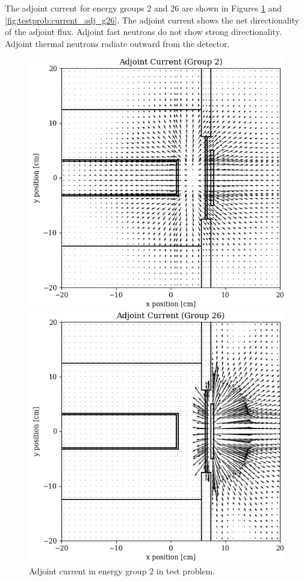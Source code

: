 The adjoint current for energy groups 2 and 26 are shown in Figures \ref{fig:testprob:current_adj_g02} and \ref{fig:testprob:current_adj_g26}.
The adjoint current shows the net directionality of the adjoint flux.
Adjoint fast neutrons do not show strong directionality.
Adjoint thermal neutrons radiate outward from the detector.

\begin{figure}
  \begin{minipage}{0.49\linewidth}
    \centering
    \includegraphics[width=\linewidth]{content/testprob/current_adj_g02.png}
    \caption{Adjoint current in energy group 2 in test problem.}
    \label{fig:testprob:current_adj_g02}
  \end{minipage}
  \hfill
  \begin{minipage}{0.49\linewidth}
    \centering
    \includegraphics[width=\linewidth]{content/testprob/current_adj_g26.png}

\end{minipage}
\end{figure}
